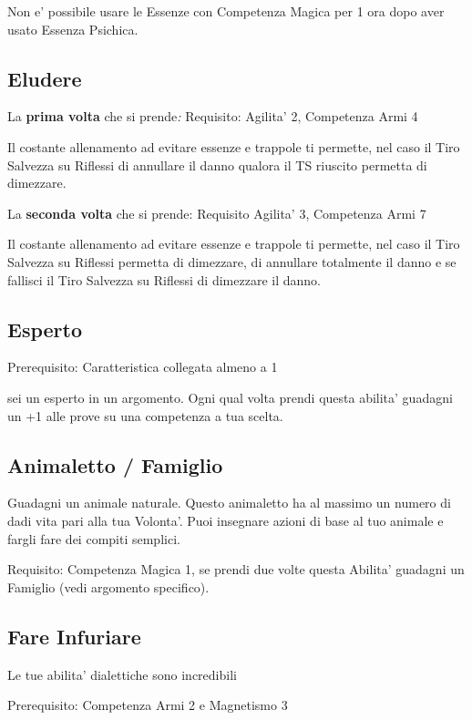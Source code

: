 \documentclass[a4paper,11pt,twoside,openany]{dndbook}
\begin{document}
Non e' possibile usare le Essenze con Competenza Magica per 1 ora dopo aver usato Essenza Psichica.

\subsection{Eludere}

La \textbf{prima volta} che si prende\emph{:} Requisito: Agilita'
2, Competenza Armi 4

Il costante allenamento ad evitare essenze e trappole ti permette, nel caso il Tiro Salvezza su Riflessi di annullare il danno qualora il TS riuscito permetta di dimezzare.

La \textbf{seconda volta} che si prende: Requisito Agilita' 3, Competenza
Armi 7

Il costante allenamento ad evitare essenze e trappole ti permette, nel caso il Tiro Salvezza su Riflessi permetta di dimezzare, di annullare totalmente il danno e se fallisci il Tiro Salvezza su Riflessi di dimezzare il danno.

\subsection{Esperto}

Prerequisito: Caratteristica collegata almeno a 1

sei un esperto in un argomento. Ogni qual volta prendi questa abilita' guadagni un +1 alle prove su una competenza a tua scelta.

\subsection{Animaletto / Famiglio}

Guadagni un animale naturale. Questo animaletto ha al massimo un numero di dadi vita pari alla tua Volonta'. Puoi insegnare azioni di base al tuo animale e fargli fare dei compiti semplici.

Requisito: Competenza Magica 1, se prendi due volte questa Abilita' guadagni un Famiglio (vedi argomento specifico).

\subsection{Fare Infuriare}

Le tue abilita' dialettiche sono incredibili

Prerequisito: Competenza Armi 2 e Magnetismo 3
\end{document}
